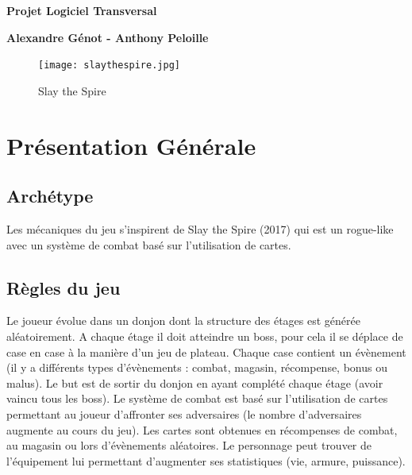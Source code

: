 \documentclass[a4paper,12pt]{article}
\begin{document}
\thispagestyle{empty}

\begin{titlepage}

\vspace*{2cm}

\begin{center}\textbf{\Huge Projet Logiciel Transversal}\end{center}{\Large \par}

\begin{center}\textbf{\large Alexandre Génot - Anthony Peloille}\end{center}{\large \par}

\vspace{2cm}

\begin{figure}[h]
\begin{center}
\texttt{[image: slaythespire.jpg]}
\caption{\label{Slay the Spire}Slay the Spire}
\end{center}
\end{figure}

\clearpage

{\small
\tableofcontents
}

\end{titlepage}

\clearpage
\section{Présentation Générale}

\subsection{Archétype}

Les mécaniques du jeu s'inspirent de Slay the Spire (2017) qui est un rogue-like avec un système de combat basé sur l'utilisation de cartes.

\subsection{Règles du jeu}

Le joueur évolue dans un donjon dont la structure des étages est générée aléatoirement. A chaque étage il doit atteindre un boss, pour cela il se déplace de case en case à la manière d’un jeu de plateau. Chaque case contient un évènement (il y a différents types d’évènements : combat, magasin, récompense, bonus ou malus). Le but est de sortir du donjon en ayant complété chaque étage (avoir vaincu tous les boss). Le système de combat est basé sur l’utilisation de cartes permettant au joueur d’affronter ses adversaires (le nombre d’adversaires augmente au cours du jeu). Les cartes sont obtenues en récompenses de combat, au magasin ou lors d’évènements aléatoires. Le personnage peut trouver de l’équipement lui permettant d’augmenter ses statistiques (vie, armure, puissance).
\end{document}
